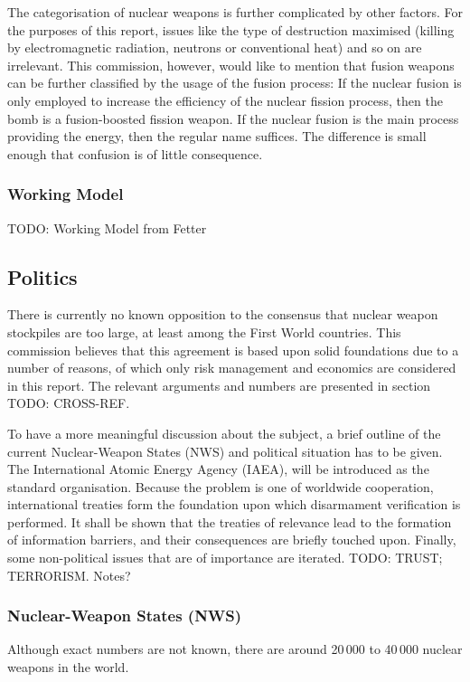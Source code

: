 \documentclass[twoside,titlepage,11pt,twocolumn,a4paper]{article}
\begin{document}
The categorisation of nuclear weapons is further complicated by other
factors. For the purposes of this report, issues like the type of
destruction maximised (killing by electromagnetic radiation, neutrons
or conventional heat) and so on are irrelevant. This commission,
however, would like to mention that fusion weapons can be further
classified by the usage of the fusion process: If the nuclear fusion
is only employed to increase the efficiency of the nuclear fission
process, then the bomb is a fusion-boosted fission weapon. If the
nuclear fusion is the main process providing the energy, then the
regular name suffices. The difference is small enough that confusion
is of little consequence.

\subsubsection{Working Model}
TODO: Working Model from Fetter
\subsection{Politics}
There is currently no known opposition to the consensus that nuclear
weapon stockpiles are too large, at least among the First World
countries. This commission believes that this agreement is based upon
solid foundations due to a number of reasons, of which only risk
management and economics are considered in this report. The relevant
arguments and numbers are presented in section TODO: CROSS-REF. 

To have a more meaningful discussion about the subject, a brief
outline of the current Nuclear-Weapon States (NWS) and political
situation has to be given. The International Atomic Energy Agency
(IAEA), will be introduced as the standard organisation. Because the
problem is one of worldwide cooperation, international treaties form
the foundation upon which disarmament verification is performed. It
shall be shown that the treaties of relevance lead to the formation of
information barriers, and their consequences are briefly touched
upon. Finally, some non-political issues that are of importance are
iterated. TODO: TRUST; TERRORISM. Notes?

\subsubsection{Nuclear-Weapon States (NWS)}
Although exact numbers are not known, there are around 20\,000 to
40\,000 nuclear weapons in the world. \citep{worldNuclearForces2011,
  norris2010}
\end{document}

